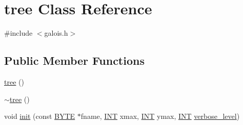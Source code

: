 \hypertarget{classtree}{}\section{tree Class Reference}
\label{classtree}


{\ttfamily \#include $<$galois.\+h$>$}

\subsection*{Public Member Functions}
\begin{DoxyCompactItemize}
\item 
\mbox{\hyperlink{classtree_a9f2a566ac2710fafc31232456780e82d}{tree}} ()
\item 
\mbox{\hyperlink{classtree_a05f3faa3c9a8f6fed237e2d0f6172244}{$\sim$tree}} ()
\item 
void \mbox{\hyperlink{classtree_ab4ab2c30e56a517dd960e5d5af2038ca}{init}} (const \mbox{\hyperlink{galois_8h_ab6cc7b4aeb6ea31aba2b3fbfc83ff5e6}{B\+Y\+TE}} $\ast$fname, \mbox{\hyperlink{galois_8h_a09fddde158a3a20bd2dcadb609de11dc}{I\+NT}} xmax, \mbox{\hyperlink{galois_8h_a09fddde158a3a20bd2dcadb609de11dc}{I\+NT}} ymax, \mbox{\hyperlink{galois_8h_a09fddde158a3a20bd2dcadb609de11dc}{I\+NT}} \mbox{\hyperlink{simeon_8_c_a818073fbcc2f439e7c56952f67386122}{verbose\+\_\+level}})
\item 

\end{DoxyCompactItemize}
